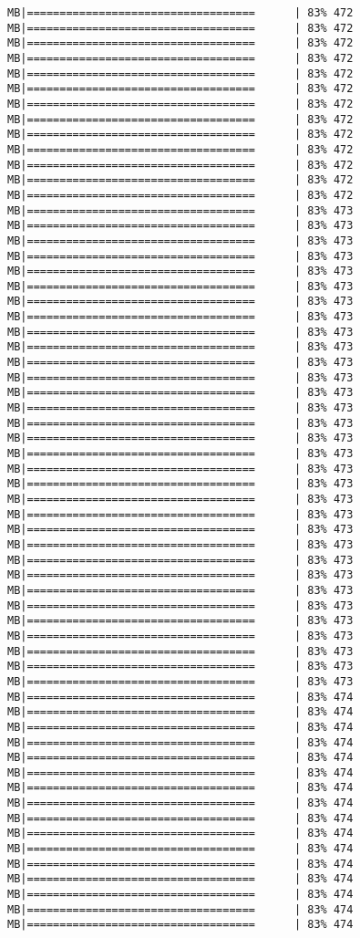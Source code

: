 \documentclass[
]{article}
\begin{document}
\begin{verbatim}
MB|===================================      | 83% 472 MB|===================================      | 83% 472 MB|===================================      | 83% 472 MB|===================================      | 83% 472 MB|===================================      | 83% 472 MB|===================================      | 83% 472 MB|===================================      | 83% 472 MB|===================================      | 83% 472 MB|===================================      | 83% 472 MB|===================================      | 83% 472 MB|===================================      | 83% 472 MB|===================================      | 83% 472 MB|===================================      | 83% 472 MB|===================================      | 83% 473 MB|===================================      | 83% 473 MB|===================================      | 83% 473 MB|===================================      | 83% 473 MB|===================================      | 83% 473 MB|===================================      | 83% 473 MB|===================================      | 83% 473 MB|===================================      | 83% 473 MB|===================================      | 83% 473 MB|===================================      | 83% 473 MB|===================================      | 83% 473 MB|===================================      | 83% 473 MB|===================================      | 83% 473 MB|===================================      | 83% 473 MB|===================================      | 83% 473 MB|===================================      | 83% 473 MB|===================================      | 83% 473 MB|===================================      | 83% 473 MB|===================================      | 83% 473 MB|===================================      | 83% 473 MB|===================================      | 83% 473 MB|===================================      | 83% 473 MB|===================================      | 83% 473 MB|===================================      | 83% 473 MB|===================================      | 83% 473 MB|===================================      | 83% 473 MB|===================================      | 83% 473 MB|===================================      | 83% 473 MB|===================================      | 83% 473 MB|===================================      | 83% 473 MB|===================================      | 83% 473 MB|===================================      | 83% 473 MB|===================================      | 83% 474 MB|===================================      | 83% 474 MB|===================================      | 83% 474 MB|===================================      | 83% 474 MB|===================================      | 83% 474 MB|===================================      | 83% 474 MB|===================================      | 83% 474 MB|===================================      | 83% 474 MB|===================================      | 83% 474 MB|===================================      | 83% 474 MB|===================================      | 83% 474 MB|===================================      | 83% 474 MB|===================================      | 83% 474 MB|===================================      | 83% 474 MB|===================================      | 83% 474 MB|===================================      | 83% 474 
\end{verbatim}
\end{document}
